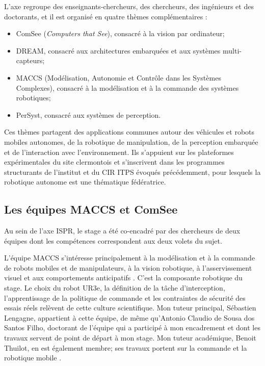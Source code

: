 \documentclass[a4paper,11pt]{report}
\begin{document}
L'axe regroupe des enseignants-chercheurs, des chercheurs, des ingénieurs et des doctorants, et il est organisé en quatre thèmes complémentaires \cite{ispr-axe}:

\begin{itemize}
  \item ComSee (\emph{Computers that See}), consacré à la vision par ordinateur;
  \item DREAM, consacré aux architectures embarquées et aux systèmes multi-capteurs;
  \item MACCS (Modélisation, Autonomie et Contrôle dans les Systèmes Complexes), consacré à la modélisation et à la commande des systèmes robotiques;
  \item PerSyst, consacré aux systèmes de perception.
\end{itemize}

Ces thèmes partagent des applications communes autour des véhicules et robots mobiles autonomes, de la robotique de manipulation, de la perception embarquée et de l'interaction avec l'environnement. Ils s'appuient sur les plateformes expérimentales du site clermontois et s'inscrivent dans les programmes structurants de l'institut et du CIR ITPS évoqués précédemment, pour lesquels la robotique autonome est une thématique fédératrice.

\subsection{Les équipes MACCS et ComSee}

Au sein de l'axe ISPR, le stage a été co-encadré par des chercheurs de deux équipes dont les compétences correspondent aux deux volets du sujet.

L'équipe MACCS s'intéresse principalement à la modélisation et à la commande de robots mobiles et de manipulateurs, à la vision robotique, à l'asservissement visuel et aux comportements anticipatifs \cite{ip-maccs}. C'est la composante robotique du stage. Le choix du robot UR3e, la définition de la tâche d'interception, l'apprentissage de la politique de commande et les contraintes de sécurité des essais réels relèvent de cette culture scientifique. Mon tuteur principal, Sébastien Lengagne, appartient à cette équipe, de même qu'Antonio Claudio de Sousa dos Santos Filho, doctorant de l'équipe qui a participé à mon encadrement et dont les travaux servent de point de départ à mon stage. Mon tuteur académique, Benoit Thuilot, en est également membre; ses travaux portent sur la commande et la robotique mobile \cite{ip-maccs}.
\end{document}
